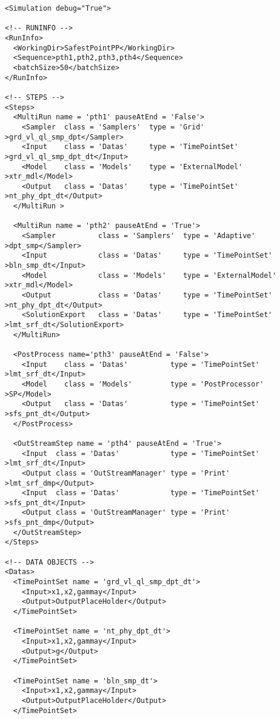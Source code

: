 \begin{lstlisting}[style=XML,morekeywords={debug,re,seeding,class,subType,limit}]
<Simulation debug="True">

<!-- RUNINFO -->
<RunInfo>
  <WorkingDir>SafestPointPP</WorkingDir>
  <Sequence>pth1,pth2,pth3,pth4</Sequence>
  <batchSize>50</batchSize>
</RunInfo>

<!-- STEPS -->
<Steps>  
  <MultiRun name = 'pth1' pauseAtEnd = 'False'>
    <Sampler  class = 'Samplers'  type = 'Grid'           >grd_vl_ql_smp_dpt</Sampler>
    <Input    class = 'Datas'     type = 'TimePointSet'   >grd_vl_ql_smp_dpt_dt</Input>
    <Model    class = 'Models'    type = 'ExternalModel'  >xtr_mdl</Model>
    <Output   class = 'Datas'     type = 'TimePointSet'   >nt_phy_dpt_dt</Output>    
  </MultiRun >
  
  <MultiRun name = 'pth2' pauseAtEnd = 'True'>
    <Sampler          class = 'Samplers'  type = 'Adaptive'      >dpt_smp</Sampler>
    <Input            class = 'Datas'     type = 'TimePointSet'  >bln_smp_dt</Input>   
    <Model            class = 'Models'    type = 'ExternalModel' >xtr_mdl</Model>
    <Output           class = 'Datas'     type = 'TimePointSet'  >nt_phy_dpt_dt</Output>            
    <SolutionExport   class = 'Datas'     type = 'TimePointSet'  >lmt_srf_dt</SolutionExport>
  </MultiRun>
  
  <PostProcess name='pth3' pauseAtEnd = 'False'>
    <Input    class = 'Datas'          type = 'TimePointSet'       >lmt_srf_dt</Input>
    <Model    class = 'Models'         type = 'PostProcessor'  >SP</Model>
    <Output   class = 'Datas'          type = 'TimePointSet'     >sfs_pnt_dt</Output>
  </PostProcess>  
  
  <OutStreamStep name = 'pth4' pauseAtEnd = 'True'>
  	<Input  class = 'Datas'            type = 'TimePointSet'  >lmt_srf_dt</Input>
  	<Output class = 'OutStreamManager' type = 'Print'         >lmt_srf_dmp</Output>
    <Input  class = 'Datas'            type = 'TimePointSet'  >sfs_pnt_dt</Input>
  	<Output class = 'OutStreamManager' type = 'Print'         >sfs_pnt_dmp</Output>
  </OutStreamStep>
</Steps>

<!-- DATA OBJECTS -->
<Datas> 
  <TimePointSet name = 'grd_vl_ql_smp_dpt_dt'>
    <Input>x1,x2,gammay</Input>
    <Output>OutputPlaceHolder</Output>
  </TimePointSet>
  
  <TimePointSet name = 'nt_phy_dpt_dt'>
    <Input>x1,x2,gammay</Input>
    <Output>g</Output>
  </TimePointSet>
    
  <TimePointSet name = 'bln_smp_dt'>
    <Input>x1,x2,gammay</Input>
    <Output>OutputPlaceHolder</Output>
  </TimePointSet>
    

\end{lstlisting}
